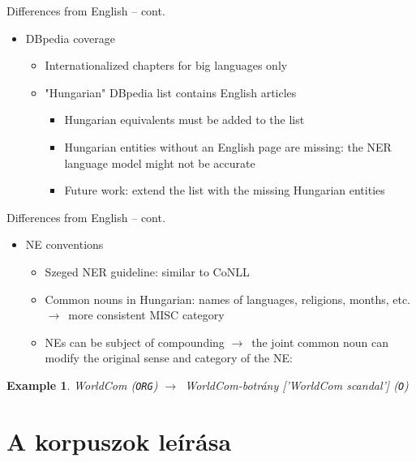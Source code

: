 \documentclass[utf8x,t]{beamer}
\newcommand{\vitem}{\item \vspace{4pt}}
\newcommand{\nyil}{$\rightarrow$\ }
\newtheorem{Examplee}{Example}[section]
\begin{document}
\begin{frame}{Differences from English -- cont.}
  \bigskip
  \begin{itemize}
  \vitem DBpedia coverage
    \smallskip
    \begin{itemize}
    \vitem Internationalized chapters for big languages only
    \vitem "Hungarian" DBpedia list contains English articles %
      \begin{itemize}
      \vitem Hungarian equivalents must be added to the list %
      \vitem Hungarian entities without an English page are missing:
             the NER language model might not be accurate
      \vitem Future work: extend the list with the missing Hungarian entities
      \end{itemize}
    \end{itemize}
  \end{itemize}
\end{frame}

\begin{frame}{Differences from English -- cont.}
  \bigskip
  \begin{itemize}
  \vitem NE conventions
    \smallskip
    \begin{itemize}
    \vitem Szeged NER guideline: similar to CoNLL
    \vitem Common nouns in Hungarian: names of languages, religions, months, etc. \nyil more consistent MISC category
    \vitem NEs can be subject of compounding \nyil the joint common noun can modify the original sense and category of the NE:
    \end{itemize}
  \end{itemize}
  \bigskip
  \begin{Examplee}
  \small{WorldCom {\normalfont(\texttt{ORG})} \nyil WorldCom-botrány ['WorldCom scandal'] {\normalfont(\texttt{O})}}
  \end{Examplee}
\end{frame}

\section{A korpuszok leírása}
\end{document}
